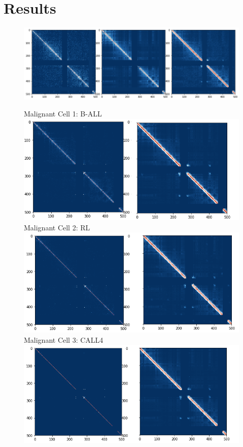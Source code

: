 \documentclass{article}
\begin{document}
\section{Results}
\begin{figure}[H]
    \centering
    \includegraphics[width=\textwidth]{mit.png}
    \caption{}
\end{figure}
\begin{figure}[H]
    \centering
        Malignant Cell 1: B-ALL
        \includegraphics[width=\textwidth]{all.png}
        \vspace{10pt}
        Malignant Cell 2: RL
        \includegraphics[width=\textwidth]{rl.png}
        \vspace{10pt}
        Malignant Cell 3: CALL4
        \includegraphics[width=\textwidth]{call4.png}
    \caption{}
\end{figure}
\end{document}

